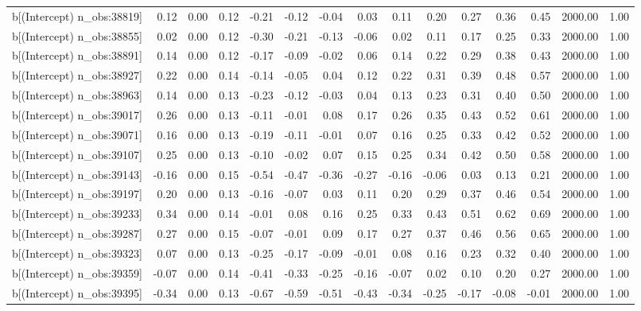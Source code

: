 \begin{table}[ht]
\begin{tabular}{rrrrrrrrrrrrrrr}
  b[(Intercept) n\_obs:38819] & 0.12 & 0.00 & 0.12 & -0.21 & -0.12 & -0.04 & 0.03 & 0.11 & 0.20 & 0.27 & 0.36 & 0.45 & 2000.00 & 1.00 \\ 
  b[(Intercept) n\_obs:38855] & 0.02 & 0.00 & 0.12 & -0.30 & -0.21 & -0.13 & -0.06 & 0.02 & 0.11 & 0.17 & 0.25 & 0.33 & 2000.00 & 1.00 \\ 
  b[(Intercept) n\_obs:38891] & 0.14 & 0.00 & 0.12 & -0.17 & -0.09 & -0.02 & 0.06 & 0.14 & 0.22 & 0.29 & 0.38 & 0.43 & 2000.00 & 1.00 \\ 
  b[(Intercept) n\_obs:38927] & 0.22 & 0.00 & 0.14 & -0.14 & -0.05 & 0.04 & 0.12 & 0.22 & 0.31 & 0.39 & 0.48 & 0.57 & 2000.00 & 1.00 \\ 
  b[(Intercept) n\_obs:38963] & 0.14 & 0.00 & 0.13 & -0.23 & -0.12 & -0.03 & 0.04 & 0.13 & 0.23 & 0.31 & 0.40 & 0.50 & 2000.00 & 1.00 \\ 
  b[(Intercept) n\_obs:39017] & 0.26 & 0.00 & 0.13 & -0.11 & -0.01 & 0.08 & 0.17 & 0.26 & 0.35 & 0.43 & 0.52 & 0.61 & 2000.00 & 1.00 \\ 
  b[(Intercept) n\_obs:39071] & 0.16 & 0.00 & 0.13 & -0.19 & -0.11 & -0.01 & 0.07 & 0.16 & 0.25 & 0.33 & 0.42 & 0.52 & 2000.00 & 1.00 \\ 
  b[(Intercept) n\_obs:39107] & 0.25 & 0.00 & 0.13 & -0.10 & -0.02 & 0.07 & 0.15 & 0.25 & 0.34 & 0.42 & 0.50 & 0.58 & 2000.00 & 1.00 \\ 
  b[(Intercept) n\_obs:39143] & -0.16 & 0.00 & 0.15 & -0.54 & -0.47 & -0.36 & -0.27 & -0.16 & -0.06 & 0.03 & 0.13 & 0.21 & 2000.00 & 1.00 \\ 
  b[(Intercept) n\_obs:39197] & 0.20 & 0.00 & 0.13 & -0.16 & -0.07 & 0.03 & 0.11 & 0.20 & 0.29 & 0.37 & 0.46 & 0.54 & 2000.00 & 1.00 \\ 
  b[(Intercept) n\_obs:39233] & 0.34 & 0.00 & 0.14 & -0.01 & 0.08 & 0.16 & 0.25 & 0.33 & 0.43 & 0.51 & 0.62 & 0.69 & 2000.00 & 1.00 \\ 
  b[(Intercept) n\_obs:39287] & 0.27 & 0.00 & 0.15 & -0.07 & -0.01 & 0.09 & 0.17 & 0.27 & 0.37 & 0.46 & 0.56 & 0.65 & 2000.00 & 1.00 \\ 
  b[(Intercept) n\_obs:39323] & 0.07 & 0.00 & 0.13 & -0.25 & -0.17 & -0.09 & -0.01 & 0.08 & 0.16 & 0.23 & 0.32 & 0.40 & 2000.00 & 1.00 \\ 
  b[(Intercept) n\_obs:39359] & -0.07 & 0.00 & 0.14 & -0.41 & -0.33 & -0.25 & -0.16 & -0.07 & 0.02 & 0.10 & 0.20 & 0.27 & 2000.00 & 1.00 \\ 
  b[(Intercept) n\_obs:39395] & -0.34 & 0.00 & 0.13 & -0.67 & -0.59 & -0.51 & -0.43 & -0.34 & -0.25 & -0.17 & -0.08 & -0.01 & 2000.00 & 1.00 \\ 

\end{tabular}
\end{table}
